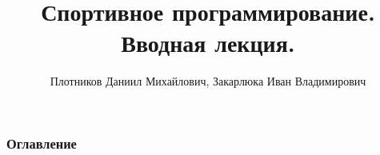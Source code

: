 \documentclass[
	11pt
	   t,
	aspectratio=169
]{beamer}
\title[Вводная лекция]{Спортивное программирование. Вводная лекция.}
\author[Плотников Д.М., Закарлюка И.В. ]{Плотников Даниил Михайлович, Закарлюка Иван Владимирович}
\institute[СПбГУ]{Санкт-Петербургский Государственный Университет}
\date[2025]{}
\begin{document}
\begin{frame}
	\titlepage
\end{frame}

\begin{frame}
	\frametitle{Оглавление}
	\tableofcontents 
\end{frame}







\end{document}
